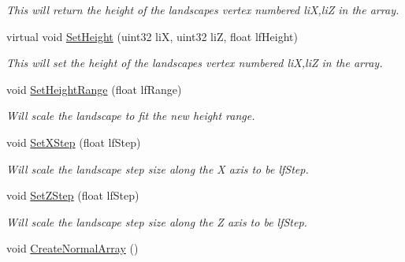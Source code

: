 \begin{DoxyCompactItemize}
\begin{DoxyCompactList}\small\item\em This will return the height of the landscapes vertex numbered liX,liZ in the array. \end{DoxyCompactList}\item 
\hypertarget{classcm_landscape_a352b08b5196e23102b44faa033776962}{
virtual void \hyperlink{classcm_landscape_a352b08b5196e23102b44faa033776962}{SetHeight} (uint32 liX, uint32 liZ, float lfHeight)}
\label{classcm_landscape_a352b08b5196e23102b44faa033776962}

\begin{DoxyCompactList}\small\item\em This will set the height of the landscapes vertex numbered liX,liZ in the array. \end{DoxyCompactList}\item 
\hypertarget{classcm_landscape_a533445e9429089809658e64114a2b9f7}{
void \hyperlink{classcm_landscape_a533445e9429089809658e64114a2b9f7}{SetHeightRange} (float lfRange)}
\label{classcm_landscape_a533445e9429089809658e64114a2b9f7}

\begin{DoxyCompactList}\small\item\em Will scale the landscape to fit the new height range. \end{DoxyCompactList}\item 
\hypertarget{classcm_landscape_afcb4ebc6f4aa1a61f49ca56bf82ec199}{
void \hyperlink{classcm_landscape_afcb4ebc6f4aa1a61f49ca56bf82ec199}{SetXStep} (float lfStep)}
\label{classcm_landscape_afcb4ebc6f4aa1a61f49ca56bf82ec199}

\begin{DoxyCompactList}\small\item\em Will scale the landscape step size along the X axis to be lfStep. \end{DoxyCompactList}\item 
\hypertarget{classcm_landscape_a552a5c4d887833220f02902ab8a1ffb5}{
void \hyperlink{classcm_landscape_a552a5c4d887833220f02902ab8a1ffb5}{SetZStep} (float lfStep)}
\label{classcm_landscape_a552a5c4d887833220f02902ab8a1ffb5}

\begin{DoxyCompactList}\small\item\em Will scale the landscape step size along the Z axis to be lfStep. \end{DoxyCompactList}\item 
\hypertarget{classcm_landscape_acfa7d1b32173940cfc8a91d6ab5dc370}{
void \hyperlink{classcm_landscape_acfa7d1b32173940cfc8a91d6ab5dc370}{CreateNormalArray} ()}
\label{classcm_landscape_acfa7d1b32173940cfc8a91d6ab5dc370}


\end{DoxyCompactItemize}
